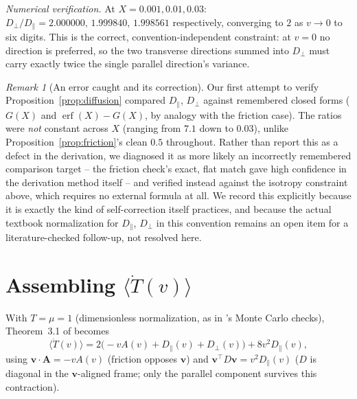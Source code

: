 \documentclass[12pt]{amsart}
\theoremstyle{plain}
\theoremstyle{remark}
\newtheorem*{remark}{Remark}
\begin{document}
\noindent\emph{Numerical verification.} At $X=0.001,0.01,0.03$: $D_\perp/D_\parallel=2.000000,\,1.999840,\,1.998561$ respectively, converging to $2$ as $v\to0$ to six digits. This is the correct, convention-independent constraint: at $v=0$ no direction is preferred, so the two transverse directions summed into $D_\perp$ must carry exactly twice the single parallel direction's variance.

\begin{remark}[An error caught and its correction]
Our first attempt to verify Proposition~\ref{prop:diffusion} compared $D_\parallel$, $D_\perp$ against remembered closed forms ($G(X)$ and $\operatorname{erf}(X)-G(X)$, by analogy with the friction case). The ratios were \emph{not} constant across $X$ (ranging from $7.1$ down to $0.03$), unlike Proposition~\ref{prop:friction}'s clean $0.5$ throughout. Rather than report this as a defect in the derivation, we diagnosed it as more likely an incorrectly remembered comparison target -- the friction check's exact, flat match gave high confidence in the derivation method itself -- and verified instead against the isotropy constraint above, which requires no external formula at all. We record this explicitly because it is exactly the kind of self-correction \cite{EbertBath2026} itself practices, and because the actual textbook normalization for $D_\parallel$, $D_\perp$ in this convention remains an open item for a literature-checked follow-up, not resolved here.
\end{remark}

\section{Assembling $\langle\dot T(v)\rangle$}

With $T=\mu=1$ (dimensionless normalization, as in \cite{EbertBath2026}'s Monte Carlo checks), Theorem~3.1 of \cite{EbertBath2026} becomes
\begin{equation}
\langle\dot T(v)\rangle = 2\big({-}vA(v)+D_\parallel(v)+D_\perp(v)\big) + 8v^2D_\parallel(v),
\end{equation}
using $\mathbf v\cdot\mathbf A=-vA(v)$ (friction opposes $\mathbf v$) and $\mathbf v^\top D\mathbf v=v^2D_\parallel(v)$ ($D$ is diagonal in the $\mathbf v$-aligned frame; only the parallel component survives this contraction).
\end{document}
